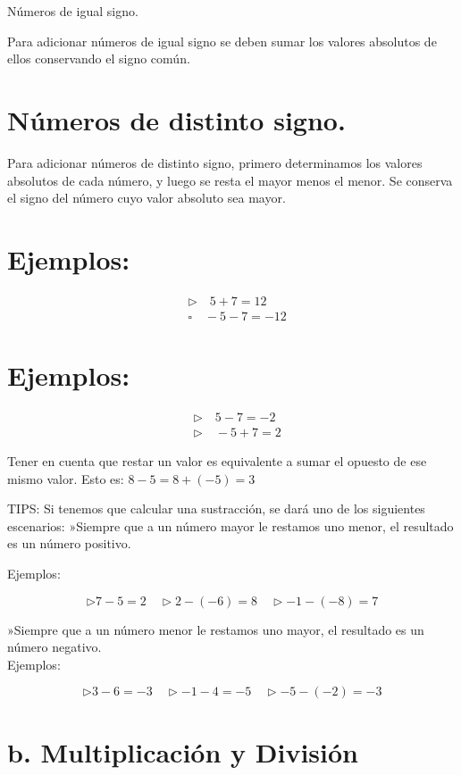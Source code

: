 \documentclass[10pt]{article}
\begin{document}
Números de igual signo.

Para adicionar números de igual signo se deben sumar los valores absolutos de ellos conservando el signo común.

\section*{Números de distinto signo.}
Para adicionar números de distinto signo, primero determinamos los valores absolutos de cada número, y luego se resta el mayor menos el menor. Se conserva el signo del número cuyo valor absoluto sea mayor.

\section*{Ejemplos:}
$$
\begin{aligned}
& \triangleright \quad 5+7=12 \\
& \square \quad-5-7=-12
\end{aligned}
$$

\section*{Ejemplos:}
$$
\begin{aligned}
& \triangleright \quad 5-7=-2 \\
& \triangleright \quad-5+7=2
\end{aligned}
$$

Tener en cuenta que restar un valor es equivalente a sumar el opuesto de ese mismo valor. Esto es: $8-5=8+(-5)=3$

TIPS: Si tenemos que calcular una sustracción, se dará uno de los siguientes escenarios: »Siempre que a un número mayor le restamos uno menor, el resultado es un número positivo.

Ejemplos:

$$
\triangleright 7-5=2 \quad \triangleright 2-(-6)=8 \quad \triangleright-1-(-8)=7
$$

»Siempre que a un número menor le restamos uno mayor, el resultado es un número negativo.\\
Ejemplos:

$$
\triangleright 3-6=-3 \quad \triangleright-1-4=-5 \quad \triangleright-5-(-2)=-3
$$

\section*{b. Multiplicación y División}
\end{document}
